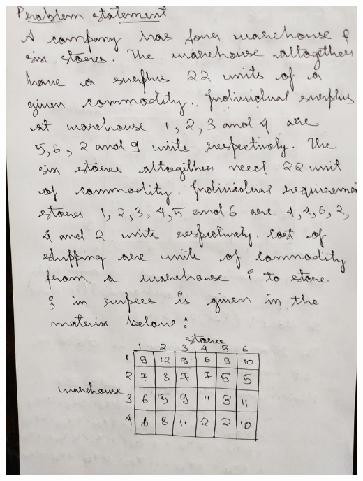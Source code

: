 \documentclass[12pt, letterpaper, twoside]{book}
\begin{document}
\begin{flushleft}
\includegraphics[width=\paperwidth, height=10in]{Page7}
\end{flushleft}
\end{document}
